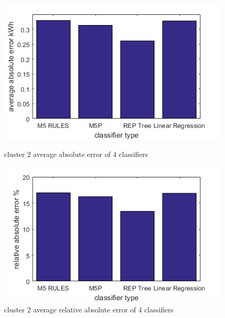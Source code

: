\begin{figure}
\centering
\begin{minipage}{.5\textwidth}
  \centering
  \includegraphics[width=\linewidth]{cluster-2-diff-classifier-avg-abs.png}
  \caption{cluster 2 average absolute error of 4 classifiers}
  \label{fig:cluster-2-predictors}
\end{minipage}%
\begin{minipage}{.5\textwidth}
  \centering
  \includegraphics[width=\linewidth]{cluster-2-diff-classifier-relative-abs.png}
  \caption{cluster 2 average relative absolute error of 4 classifiers}
\end{minipage}


\end{figure}
